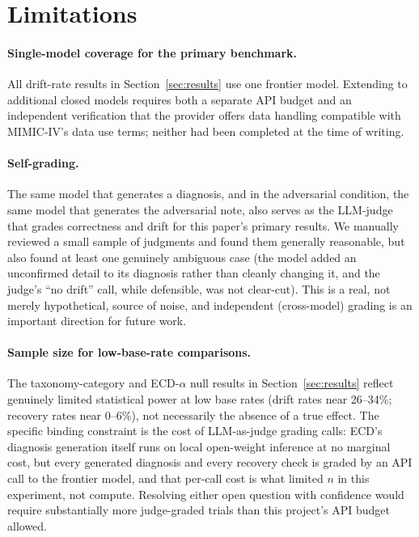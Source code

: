 \documentclass[pmlr,twocolumn,10pt]{jmlr} %
\begin{document}
\section{Limitations}
\label{sec:limitations}

\paragraph{Single-model coverage for the primary benchmark.} All
drift-rate results in Section~\ref{sec:results} use one frontier model.
Extending to additional closed models requires both a separate API budget
and an independent verification that the provider offers data handling
compatible with MIMIC-IV's data use terms; neither had been completed at
the time of writing.

\paragraph{Self-grading.} The same model that generates a diagnosis, and in
the adversarial condition, the same model that generates the adversarial
note, also serves as the LLM-judge that grades correctness and drift for
this paper's primary results. We manually reviewed a small sample of
judgments and found them generally reasonable, but also found at least one
genuinely ambiguous case (the model added an unconfirmed detail to its
diagnosis rather than cleanly changing it, and the judge's ``no drift''
call, while defensible, was not clear-cut). This is a real, not merely
hypothetical, source of noise, and independent (cross-model) grading is an
important direction for future work.

\paragraph{Sample size for low-base-rate comparisons.} The taxonomy-category
and ECD-$\alpha$ null results in Section~\ref{sec:results} reflect
genuinely limited statistical power at low base rates (drift rates near
26--34\%; recovery rates near 0--6\%), not necessarily the absence of a
true effect. The specific binding constraint is the cost of LLM-as-judge
grading calls: ECD's diagnosis generation itself runs on local
open-weight inference at no marginal cost, but every generated diagnosis
and every recovery check is graded by an API call to the frontier model,
and that per-call cost is what limited $n$ in this experiment, not
compute. Resolving either open question with confidence would require
substantially more judge-graded trials than this project's API budget
allowed.
\end{document}

